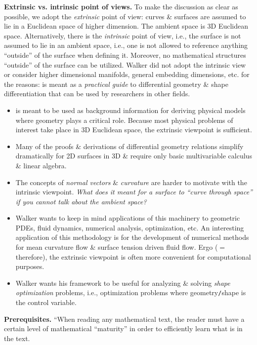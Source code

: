 \documentclass{article}
\begin{document}
\begin{enumerate}
	{\bf Extrinsic vs. intrinsic point of views.} To make the discussion as clear as possible, we adopt the {\it extrinsic} point of view: curves \& surfaces are assumed to lie in a Euclidean space of higher dimension. The ambient space is 3D Euclidean space. Alternatively, there is the {\it intrinsic} point of view, i.e., the surface is not assumed to lie in an ambient space, i.e., one is not allowed to reference anything ``outside'' of the surface when defining it. Moreover, no mathematical structures ``outside'' of the surface can be utilized. Walker \cite{Walker2015} did not adopt the intrinsic view or consider higher dimensional manifolds, general embedding dimensions, etc. for the reasons: \cite{Walker2015} is meant as a {\it practical guide} to differential geometry \& shape differentiation that can be used by researchers in other fields.
	\begin{itemize}
		\item \cite{Walker2015} is meant to be used as background information for deriving physical models where geometry plays a critical role. Because most physical problems of interest take place in 3D Euclidean space, the extrinsic viewpoint is sufficient.
		\item Many of the proofs \& derivations of differential geometry relations simplify dramatically for 2D surfaces in 3D \& require only basic multivariable calculus \& linear algebra.
		\item The concepts of {\it normal vectors} \& {\it curvature} are harder to motivate with the intrinsic viewpoint. {\it What does it meant for a surface to ``curve through space'' if you cannot talk about the ambient space?}
		\item Walker wants to keep in mind applications of this machinery to geometric PDEs, fluid dynamics, numerical analysis, optimization, etc. An interesting application of this methodology is for the development of numerical methods for mean curvature flow \& surface tension driven fluid flow. Ergo ($=$ therefore), the extrinsic viewpoint is often more convenient for computational purposes.
		\item Walker wants his framework to be useful for analyzing \& solving {\it shape optimization} problems, i.e., optimization problems where geometry{\tt/}shape is the control variable.
	\end{itemize}
	{\bf Prerequisites.} ``When reading any mathematical text, the reader must have a certain level of mathematical ``maturity'' in order to efficiently learn what is in the text.
\end{enumerate}
\end{document}
